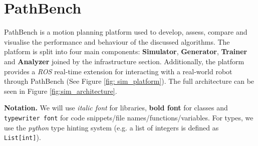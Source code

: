 \chapter{PathBench} \label{Simulation Platform}

PathBench is a motion planning platform used to develop, assess, compare and visualise the performance and behaviour of the discussed algorithms. The platform is split into four main components: \textbf{Simulator}, \textbf{Generator}, \textbf{Trainer} and \textbf{Analyzer} joined by the infrastructure section. Additionally, the platform provides a \textit{ROS} real-time extension for interacting with a real-world robot through PathBench (See Figure \ref{fig: sim_platform}). The full architecture can be seen in Figure \ref{fig:sim_architecture}. 


\textbf{Notation.} We will use \textit{italic font} for libraries, \textbf{bold font} for classes and \texttt{typewriter font} for code snippets/file names/functions/variables. For types, we use the \textit{python} type hinting system (e.g. a list of integers is defined as \texttt{List[int]}).



